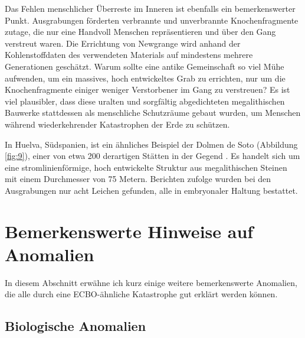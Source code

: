 \documentclass[10pt,twocolumn,letterpaper]{article}
\begin{document}
Das Fehlen menschlicher Überreste im Inneren ist ebenfalls ein bemerkenswerter Punkt. Ausgrabungen förderten verbrannte und unverbrannte Knochenfragmente zutage, die nur eine Handvoll Menschen repräsentieren und über den Gang verstreut waren. Die Errichtung von Newgrange wird anhand der Kohlenstoffdaten des verwendeten Materials auf mindestens mehrere Generationen geschätzt. Warum sollte eine antike Gemeinschaft so viel Mühe aufwenden, um ein massives, hoch entwickeltes Grab zu errichten, nur um die Knochenfragmente einiger weniger Verstorbener im Gang zu verstreuen? Es ist viel plausibler, dass diese uralten und sorgfältig abgedichteten megalithischen Bauwerke stattdessen als menschliche Schutzräume gebaut wurden, um Menschen während wiederkehrender Katastrophen der Erde zu schützen.

In Huelva, Südspanien, ist ein ähnliches Beispiel der Dolmen de Soto (Abbildung \ref{fig:9}), einer von etwa 200 derartigen Stätten in der Gegend \cite{72,32}. Es handelt sich um eine stromlinienförmige, hoch entwickelte Struktur aus megalithischen Steinen mit einem Durchmesser von 75 Metern. Berichten zufolge wurden bei den Ausgrabungen nur acht Leichen gefunden, alle in embryonaler Haltung bestattet.

\section{Bemerkenswerte Hinweise auf Anomalien}

In diesem Abschnitt erwähne ich kurz einige weitere bemerkenswerte Anomalien, die alle durch eine ECBO-ähnliche Katastrophe gut erklärt werden können.

\subsection{Biologische Anomalien}
\end{document}
